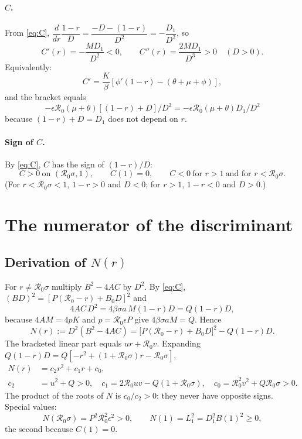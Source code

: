 \documentclass[11pt]{article}
\theoremstyle{remark}
\newcommand{\R}{\mathcal R_0}
\begin{document}
\paragraph{$C$.} From \eqref{eq:C}, $\dfrac{d}{dr}\dfrac{1-r}{D}=\dfrac{-D-(1-r)}{D^2}=-\dfrac{D_1}{D^2}$, so
\begin{equation}
C'(r)=-\frac{M D_1}{D^2}<0,\qquad C''(r)=\frac{2MD_1}{D^3}>0\quad(D>0).
\label{eq:dC}
\end{equation}
Equivalently:  $$C'=\frac K\beta[\phi'(1-r)-(\theta+\mu+\phi)], $$
and the bracket equals $$-\epsilon\R(\mu+\theta)[(1-r)+D]/D^2=-\epsilon\R(\mu+\theta)D_1/D^2$$ because $(1-r)+D=D_1$ does not depend on $r$.

\paragraph{Sign of $C$.} By \eqref{eq:C}, $C$ has the sign of $(1-r)/D$:
\begin{equation}
C>0\ \text{on }(\R\sigma,1),\qquad C(1)=0,\qquad C<0\ \text{for } r>1\ \text{and for } r<\R\sigma .
\label{eq:Csign}
\end{equation}
(For $r<\R\sigma<1$, $1-r>0$ and $D<0$; for $r>1$, $1-r<0$ and $D>0$.)

\section{The numerator of the discriminant}\label{sec:N}

\subsection{Derivation of $N(r)$}

For $r\neq\R\sigma$ multiply $B^2-4AC$ by $D^2$. By \eqref{eq:C}, $(BD)^2=[P(\R-r)+B_0D]^2$ and $$4AC\,D^2=4\beta\sigma a\,M(1-r)D=Q(1-r)D, $$
because $4A M=4pK$ and $p=\R\epsilon P$ give $4\beta\sigma a M=Q$. Hence
\begin{equation}
N(r):=D^2(B^2-4AC)=\big[P(\R-r)+B_0D\big]^2-Q(1-r)D .
\label{eq:N}
\end{equation}
The bracketed linear part equals $ur+\R v$. Expanding $Q(1-r)D=Q[-r^2+(1+\R\sigma)r-\R\sigma]$,
\begin{align}
N(r)&=c_2r^2+c_1r+c_0,\nonumber\\
c_2&=u^2+Q>0,\quad c_1=2\R uv-Q(1+\R\sigma),\quad c_0=\R^2v^2+Q\R\sigma>0 .
\label{eq:coef}
\end{align}
The product of the roots of $N$ is $c_0/c_2>0$: they  never have opposite signs. Special values:
\begin{equation}
N(\R\sigma)=P^2\R^2\epsilon^2>0,\qquad N(1)=L_1^2=D_1^2B(1)^2\ge0,
\label{eq:Nspecial}
\end{equation}
the second because $C(1)=0$.
\end{document}
